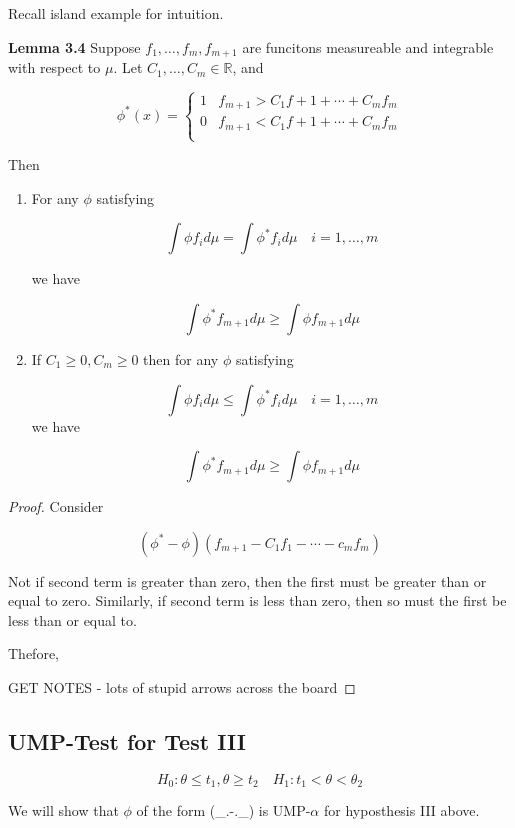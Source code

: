 \documentclass[11pt,fleqn]{book} %
\begin{document}
Recall island example for intuition. 

\textbf{Lemma 3.4} Suppose $f_1, \dots, f_m, f_{m + 1}$ are funcitons measureable and integrable with respect to $\mu$. Let $C_1, \dots, C_m \in \mathbb{R}$, and

		$$\phi^*(x) = \left\{ \begin{array}{ll}
			1 & f_{m+1} > C_1 f+1 + \cdots + C_m f_m\\
			0 & f_{m+1} < C_1 f+1 + \cdots + C_m f_m\\
		\end{array}\right. $$

Then 

	\begin{enumerate}
		\item For any $\phi$ satisfying

				$$\int \phi f_i d\mu = \int \phi^* f_i d\mu \quad i = 1, \dots, m $$ 

		we have

				$$\int \phi^* f_{m+1} d\mu \geq \int \phi f_{m + 1} d\mu$$

		\item If $C_1 \geq 0, C_m \geq 0$ then for any $\phi$ satisfying

				$$\int \phi f_i d\mu \leq \int \phi^* f_i d\mu \quad i = 1, \dots, m $$
		we have

				$$\int \phi^* f_{m+1} d\mu \geq \int \phi f_{m+1} d\mu $$
	\end{enumerate}

\begin{proof}
Consider 	

		$$(\phi^* - \phi)(f_{m+1} - C_1 f_1 - \cdots - c_m f_m) $$

Not if second term is greater than zero, then the first must be greater than or equal to zero. Similarly, if second term is less than zero, then so must the first be less than or equal to. 

Thefore,

GET NOTES - lots of stupid arrows across the board
	
\end{proof}

\subsection{UMP-Test for Test III}

		$$H_0: \theta \leq t_1, \theta \geq t_2 \quad H_1: t_1 < \theta < \theta_2$$


We will show that $\phi$ of the form (\_.-.\_) is UMP-$\alpha$ for hyposthesis III above. 
\end{document}
